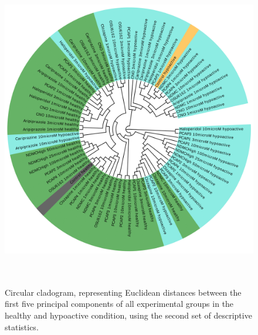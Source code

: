 \documentclass[a4paper,12pt]{article}
\begin{document}
\begin{figure}[h!]
\begin{center}
\includegraphics[width=14cm,height=14cm]{DarkApoLow_set2_PCA_tree_A.png}
\caption{Circular cladogram, representing Euclidean distances between the first five principal components of all experimental groups in the healthy and hypoactive condition, using the second set of descriptive statistics.}
\end{center}
\end{figure}
\newpage
\end{document}

